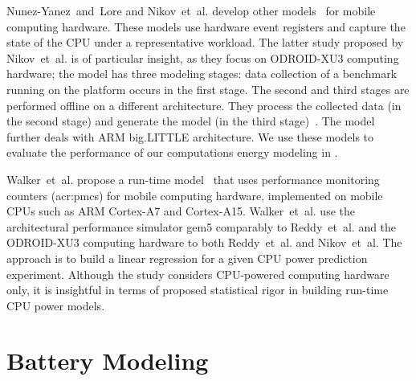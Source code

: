 Nunez-Yanez~and~Lore and Nikov~et~al. develop other models~\citep{nunez2013enabling,nikov2015evaluation} for mobile computing hardware. These models use hardware event registers and capture the state of the CPU under a representative workload. The latter study proposed by Nikov~et~al. is of particular insight, as they focus on ODROID-XU3 computing hardware; the model has three modeling stages: data collection of a benchmark running on the platform occurs in the first stage. The second and third stages are performed offline on a different architecture. They process the collected data (in the second stage) and generate the model (in the third stage)~\citep{seewald2019coarse}. The model further deals with ARM big.LITTLE architecture. We use these models to evaluate the performance of our computations energy modeling in .

Walker~et~al. propose a run-time model~\citep{walker2017accurate} that uses performance monitoring counters (\Gls{acr:pmc}s) for mobile computing hardware, implemented on mobile CPUs such as ARM Cortex-A7 and Cortex-A15. Walker~et~al. use the architectural performance simulator gem5 comparably to Reddy~et~al. and the ODROID-XU3 computing hardware to both Reddy~et~al. and Nikov~et~al. The approach is to build a linear regression for a given CPU power prediction experiment. Although the study considers CPU-powered computing hardware only, it is insightful in terms of proposed statistical rigor in building run-time CPU power models.


\section{Battery Modeling}
\label{sec:soa-ene-bat}

